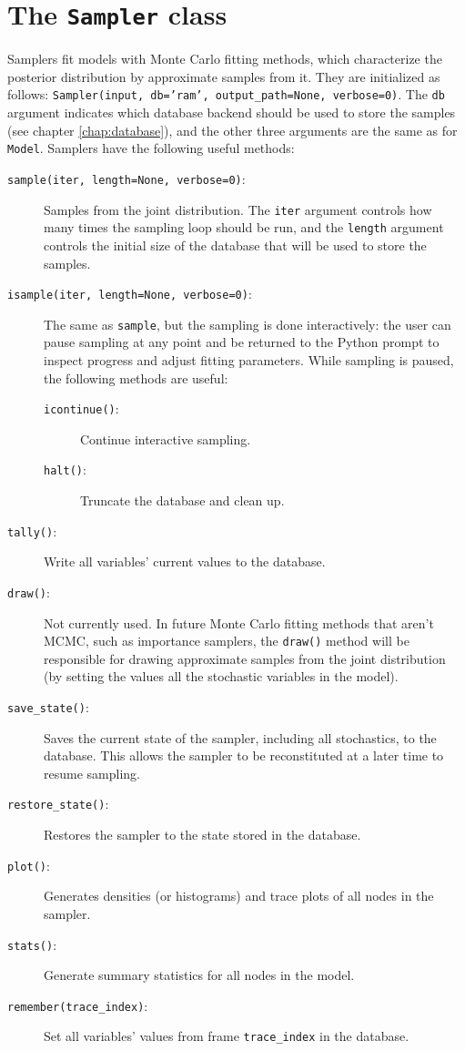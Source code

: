 \hypertarget{sampler}{}
\section*{The \texttt{Sampler} class} \label{sec:Sampler}
Samplers fit models with Monte Carlo fitting methods, which characterize the posterior distribution by approximate samples from it. They are initialized as follows: \texttt{Sampler(input, db='ram', output\_path=None, verbose=0)}. The \texttt{db} argument indicates which database backend should be used to store the samples (see chapter \ref{chap:database}), and the other three arguments are the same as for \texttt{Model}. Samplers have the following useful methods:
\begin{description}
    \item[\texttt{sample(iter, length=None, verbose=0)}:] Samples from the joint distribution. The \texttt{iter} argument controls how many times the sampling loop should be run, and the \texttt{length} argument controls the initial size of the database that will be used to store the samples.
    \item[\texttt{isample(iter, length=None, verbose=0)}:] The same as \texttt{sample}, but the sampling is done interactively: the user can pause sampling at any point and be returned to the Python prompt to inspect progress and adjust fitting parameters. While sampling is paused, the following methods are useful: 
    \begin{description}
        \item[\texttt{icontinue()}:] Continue interactive sampling.
        \item[\texttt{halt()}:] Truncate the database and clean up.
    \end{description}
    \item[\texttt{tally()}:] Write all variables' current values to the database.
    \item[\texttt{draw()}:] Not currently used. In future Monte Carlo fitting methods that aren't MCMC, such as importance samplers, the \texttt{draw()} method will be responsible for drawing approximate samples from the joint distribution (by setting the values all the stochastic variables in the model).
    \item[\texttt{save\_state()}:] Saves the current state of the sampler, including all stochastics, to the database. This allows the sampler to be reconstituted at a later time to resume sampling.
    \item[\texttt{restore\_state()}:] Restores the sampler to the state stored in the database.
    \item[\texttt{plot()}:] Generates densities (or histograms) and trace plots of all nodes in the sampler.
	 \item[\texttt{stats()}:] Generate summary statistics for all nodes in the model.
    \item[\texttt{remember(trace\_index)}:] Set all variables' values from frame \texttt{trace\_index} in the database.
\end{description}

